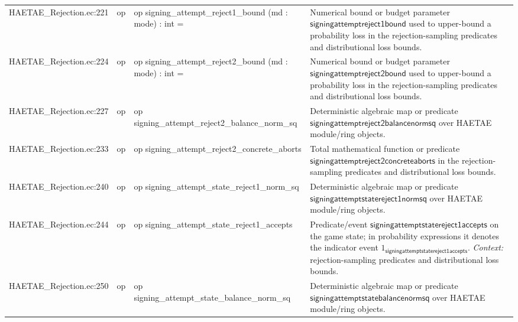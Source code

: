 \documentclass[10pt]{article}
\begin{document}
\begin{longtable}{L{0.11\textwidth}L{0.055\textwidth}L{0.385\textwidth}L{0.41\textwidth}}
HAETAE\_\allowbreak{}Rejection.\allowbreak{}ec:\allowbreak{}221 & op & {\ttfamily\scriptsize op signing\_\allowbreak{}attempt\_\allowbreak{}reject1\_\allowbreak{}bound (md : mode) : int =} & Numerical bound or budget parameter $\mathsf{signingattemptreject1bound}$ used to upper-bound a probability loss in the rejection-sampling predicates and distributional loss bounds. \\
HAETAE\_\allowbreak{}Rejection.\allowbreak{}ec:\allowbreak{}224 & op & {\ttfamily\scriptsize op signing\_\allowbreak{}attempt\_\allowbreak{}reject2\_\allowbreak{}bound (md : mode) : int =} & Numerical bound or budget parameter $\mathsf{signingattemptreject2bound}$ used to upper-bound a probability loss in the rejection-sampling predicates and distributional loss bounds. \\
HAETAE\_\allowbreak{}Rejection.\allowbreak{}ec:\allowbreak{}227 & op & {\ttfamily\scriptsize op signing\_\allowbreak{}attempt\_\allowbreak{}reject2\_\allowbreak{}balance\_\allowbreak{}norm\_\allowbreak{}sq} & Deterministic algebraic map or predicate $\mathsf{signingattemptreject2balancenormsq}$ over HAETAE module/ring objects. \\
HAETAE\_\allowbreak{}Rejection.\allowbreak{}ec:\allowbreak{}233 & op & {\ttfamily\scriptsize op signing\_\allowbreak{}attempt\_\allowbreak{}reject2\_\allowbreak{}concrete\_\allowbreak{}aborts} & Total mathematical function or predicate $\mathsf{signingattemptreject2concreteaborts}$ in the rejection-sampling predicates and distributional loss bounds. \\
HAETAE\_\allowbreak{}Rejection.\allowbreak{}ec:\allowbreak{}240 & op & {\ttfamily\scriptsize op signing\_\allowbreak{}attempt\_\allowbreak{}state\_\allowbreak{}reject1\_\allowbreak{}norm\_\allowbreak{}sq} & Deterministic algebraic map or predicate $\mathsf{signingattemptstatereject1normsq}$ over HAETAE module/ring objects. \\
HAETAE\_\allowbreak{}Rejection.\allowbreak{}ec:\allowbreak{}244 & op & {\ttfamily\scriptsize op signing\_\allowbreak{}attempt\_\allowbreak{}state\_\allowbreak{}reject1\_\allowbreak{}accepts} & Predicate/event $\mathsf{signingattemptstatereject1accepts}$ on the game state; in probability expressions it denotes the indicator event $1_{\mathsf{signingattemptstatereject1accepts}}$. \emph{Context:} rejection-sampling predicates and distributional loss bounds. \\
HAETAE\_\allowbreak{}Rejection.\allowbreak{}ec:\allowbreak{}250 & op & {\ttfamily\scriptsize op signing\_\allowbreak{}attempt\_\allowbreak{}state\_\allowbreak{}balance\_\allowbreak{}norm\_\allowbreak{}sq} & Deterministic algebraic map or predicate $\mathsf{signingattemptstatebalancenormsq}$ over HAETAE module/ring objects. \\

\end{longtable}
\end{document}
